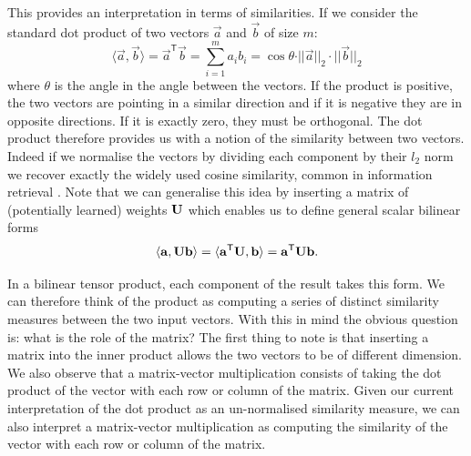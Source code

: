 This provides an interpretation
in terms of similarities. If we consider the standard dot product of two vectors 
\(\vec{a}\) and
\(\vec{b}\) of size \(m\): 
\begin{equation}
\langle\vec{a}, \vec{b}\rangle = 
\vec{a}^\mathsf{T}\vec{b}
= \sum_{i=1}^ma_ib_i
 = {\cos\theta}{\cdot||\vec{a}||_2\cdot||\vec{b}||_2} 
\end{equation} where
\(\theta\) is the angle in the angle between the vectors. If the product
is positive, the two vectors are pointing in a similar direction and if it is negative they
are in opposite directions. If it is exactly zero, they must be orthogonal. The dot product
therefore provides us with a notion of the similarity between two vectors.
Indeed if we normalise the vectors by dividing each component by their \(l_2\) norm we
recover exactly the widely used cosine similarity, common in information retrieval 
\autocite{Singhal2001, Tan2006} . Note that
we can generalise this idea by inserting a matrix of (potentially learned)
weights \(\mathbf{U}\) which enables us
to define general scalar bilinear forms
\begin{equation}
	\langle\mathbf{a}, \mathbf{U}\mathbf{b}\rangle = \langle\mathbf{a}^\mathsf{T}\mathbf{U}, \mathbf{b}\rangle
	= \mathbf{a}^\mathsf{T}\mathbf{U}\mathbf{b}.
\end{equation}

In a bilinear tensor product, each component of the result takes this form.
We can therefore think of the
product as computing a series of distinct similarity measures between the two input
vectors. With this in mind the obvious question is: what is the role of the matrix? The first
thing to note is that inserting a matrix into the inner product allows the two vectors to be
of different dimension. We also observe that a matrix-vector multiplication consists of
taking the dot product of the vector with each row or column of the matrix. Given our current
interpretation of the dot product as an un-normalised similarity measure, we can also
interpret a matrix-vector multiplication as computing the similarity of the vector with each
row or column of the matrix. 

